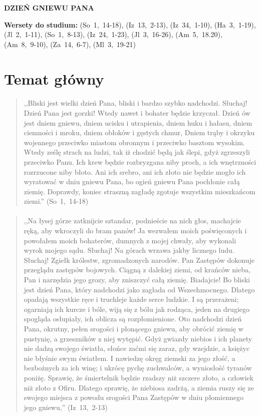 \documentclass[10pt,a4paper,oneside]{article}
\begin{document}
\centerline{\textbf{\MakeUppercase{Dzień gniewu Pana}}}
\begin{center}
\textbf{Wersety do studium:} \mbox{(So 1, 14-18)}, \mbox{(Iz 13, 2-13)}, \mbox{(Iz 34, 1-10)}, \mbox{(Ha 3, 1-19)}, \mbox{(Jl 2, 1-11)}, \mbox{(So 1, 8-13)}, \mbox{(Iz 24, 1-23)}, \mbox{(Jl 3, 16-26)}, \mbox{(Am 5, 18.20)}, \mbox{(Am 8, 9-10)}, \mbox{(Za 14, 6-7)}, \mbox{(Ml 3, 19-21)}
\end{center}
\section{Temat główny}
\paragraph{}
\begin{quote}
,,Bliski jest wielki dzień Pana, bliski i bardzo szybko nadchodzi. Słuchaj! Dzień Pana jest gorzki! Wtedy nawet i bohater będzie krzyczał. Dzień ów jest dniem gniewu, dniem ucisku i utrapienia, dniem huku i hałasu, dniem ciemności i mroku, dniem obłoków i gęstych chmur, Dniem trąby i okrzyku wojennego przeciwko miastom obronnym i przeciwko basztom wysokim. Wtedy ześlę strach na ludzi, tak iż chodzić będą jak ślepi, gdyż zgrzeszyli przeciwko Panu. Ich krew będzie rozbryzgana niby proch, a ich wnętrzności rozrzucone niby błoto. Ani ich srebro, ani ich złoto nie będzie mogło ich wyratować w dniu gniewu Pana, bo ogień gniewu Pana pochłonie całą ziemię. Doprawdy, koniec straszną zagładę zgotuje wszystkim mieszkańcom ziemi.'' \mbox{(So 1, 14-18)}
\end{quote}
\paragraph{}
\begin{quote}
,,Na łysej górze zatknijcie sztandar, podnieście na nich głos, machajcie ręką, aby wkroczyli do bram panów! Ja wezwałem moich poświęconych i powołałem moich bohaterów, dumnych z mojej chwały, aby wykonali wyrok mojego sądu. Słuchaj! Na górach wrzawa jakby licznego ludu. Słuchaj! Zgiełk królestw, zgromadzonych narodów. Pan Zastępów dokonuje przeglądu zastępów bojowych. Ciągną z dalekiej ziemi, od krańców nieba, Pan i narzędzia jego grozy, aby zniszczyć całą ziemię. Biadajcie! Bo bliski jest dzień Pana, który nadchodzi jako zagłada od Wszechmocnego. Dlatego opadają wszystkie ręce i truchleje każde serce ludzkie. I są przerażeni; ogarniają ich kurcze i bóle, wiją się z bólu jak rodząca, jeden na drugiego spogląda osłupiały, ich oblicza są rozpłomienione. Oto nadchodzi dzień Pana, okrutny, pełen srogości i płonącego gniewu, aby obrócić ziemię w pustynię, a grzeszników z niej wytępić. Gdyż gwiazdy niebios i ich planety nie dadzą swojego światła, słońce zaćmi się zaraz, gdy wzejdzie, a księżyc nie błyśnie swym światłem. I nawiedzę okręg ziemski za jego złość, a bezbożnych za ich winę; i ukrócę pychę zuchwalców, a wyniosłość tyranów poniżę. Sprawię, że śmiertelnik będzie rzadszy niż szczere złoto, a człowiek niż złoto z Ofiru. Dlatego sprawię, że niebiosa zadrżą, a ziemia ruszy się ze swojego miejsca z powodu srogości Pana Zastępów w dniu płomiennego jego gniewu,'' \mbox{(Iz 13, 2-13)}
\end{quote}
\end{document}
